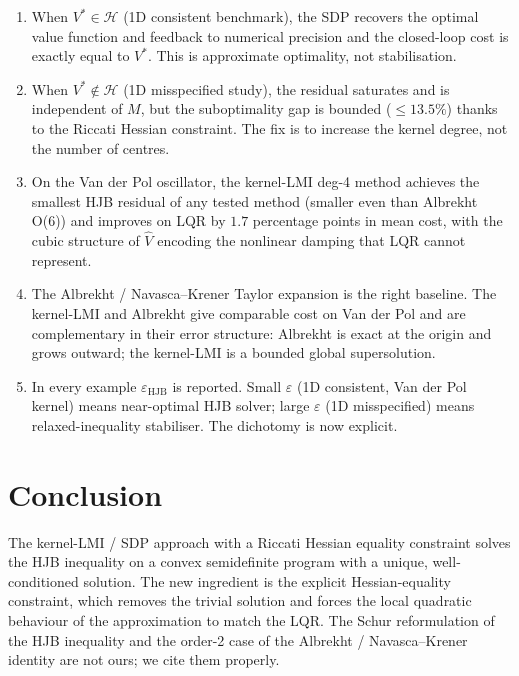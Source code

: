 \documentclass[11pt]{article}
\begin{document}
\begin{enumerate}
\item When $V^*\in\mathcal{H}$ (1D consistent benchmark), the SDP recovers the optimal value function and feedback to numerical precision and the closed-loop cost is exactly equal to $V^*$. This is approximate optimality, not stabilisation.

\item When $V^*\notin\mathcal{H}$ (1D misspecified study), the residual saturates and is independent of $M$, but the suboptimality gap is bounded ($\leq 13.5\%$) thanks to the Riccati Hessian constraint. The fix is to increase the kernel degree, not the number of centres.

\item On the Van der Pol oscillator, the kernel-LMI deg-4 method achieves the smallest HJB residual of any tested method (smaller even than Albrekht O(6)) and improves on LQR by $1.7$ percentage points in mean cost, with the cubic structure of $\hat V$ encoding the nonlinear damping that LQR cannot represent.

\item The Albrekht / Navasca--Krener Taylor expansion is the right baseline. The kernel-LMI and Albrekht give comparable cost on Van der Pol and are complementary in their error structure: Albrekht is exact at the origin and grows outward; the kernel-LMI is a bounded global supersolution.

\item In every example $\varepsilon_{\mathrm{HJB}}$ is reported. Small $\varepsilon$ (1D consistent, Van der Pol kernel) means near-optimal HJB solver; large $\varepsilon$ (1D misspecified) means relaxed-inequality stabiliser. The dichotomy is now explicit.
\end{enumerate}

\section{Conclusion}

The kernel-LMI / SDP approach with a Riccati Hessian equality constraint solves the HJB inequality on a convex semidefinite program with a unique, well-conditioned solution. The new ingredient is the explicit Hessian-equality constraint, which removes the trivial solution and forces the local quadratic behaviour of the approximation to match the LQR. The Schur reformulation of the HJB inequality and the order-2 case of the Albrekht / Navasca--Krener identity are not ours; we cite them properly.
\end{document}
